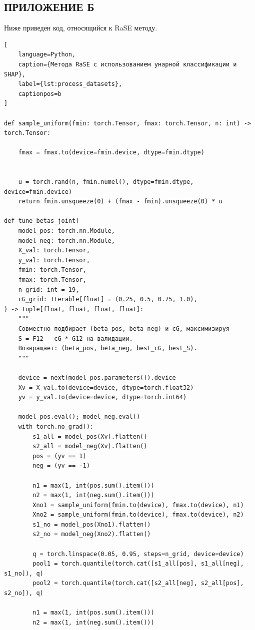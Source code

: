 \documentclass[12pt,a4paper]{article}
\begin{document}
\subsection*{ПРИЛОЖЕНИЕ Б}

Ниже приведен код, относящийся к RaSE методу.

\begin{lstlisting}[
    language=Python,
    caption={Метода RaSE с использованием унарной классификации и SHAP},
    label={lst:process_datasets},
    captionpos=b
]

def sample_uniform(fmin: torch.Tensor, fmax: torch.Tensor, n: int) -> torch.Tensor:

    fmax = fmax.to(device=fmin.device, dtype=fmin.dtype)


    u = torch.rand(n, fmin.numel(), dtype=fmin.dtype, device=fmin.device)
    return fmin.unsqueeze(0) + (fmax - fmin).unsqueeze(0) * u

def tune_betas_joint(
    model_pos: torch.nn.Module,
    model_neg: torch.nn.Module,
    X_val: torch.Tensor,
    y_val: torch.Tensor,
    fmin: torch.Tensor,
    fmax: torch.Tensor,
    n_grid: int = 19,
    cG_grid: Iterable[float] = (0.25, 0.5, 0.75, 1.0),
) -> Tuple[float, float, float, float]:
    """
    Совместно подбирает (beta_pos, beta_neg) и cG, максимизируя
    S = F12 - cG * G12 на валидации.
    Возвращает: (beta_pos, beta_neg, best_cG, best_S).
    """

    device = next(model_pos.parameters()).device
    Xv = X_val.to(device=device, dtype=torch.float32)
    yv = y_val.to(device=device, dtype=torch.int64)

    model_pos.eval(); model_neg.eval()
    with torch.no_grad():
        s1_all = model_pos(Xv).flatten()
        s2_all = model_neg(Xv).flatten()
        pos = (yv == 1)
        neg = (yv == -1)

        n1 = max(1, int(pos.sum().item()))
        n2 = max(1, int(neg.sum().item()))
        Xno1 = sample_uniform(fmin.to(device), fmax.to(device), n1)
        Xno2 = sample_uniform(fmin.to(device), fmax.to(device), n2)
        s1_no = model_pos(Xno1).flatten()
        s2_no = model_neg(Xno2).flatten()

        q = torch.linspace(0.05, 0.95, steps=n_grid, device=device)
        pool1 = torch.quantile(torch.cat([s1_all[pos], s1_all[neg], s1_no]), q)
        pool2 = torch.quantile(torch.cat([s2_all[neg], s2_all[pos], s2_no]), q)

        n1 = max(1, int(pos.sum().item()))
        n2 = max(1, int(neg.sum().item()))


\end{lstlisting}
\end{document}
